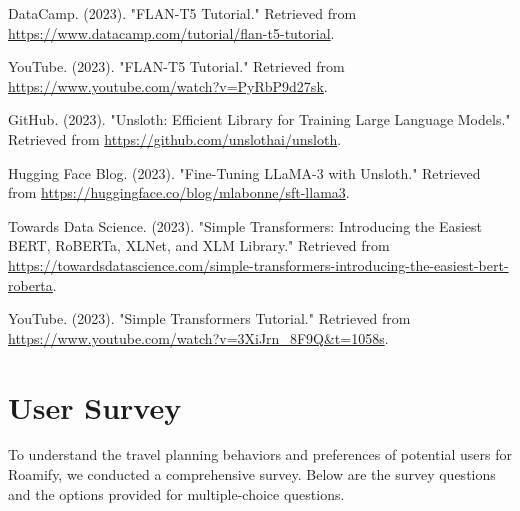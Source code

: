 \documentclass[conference]{IEEEtran}
\begin{document}
\begin{thebibliography}{1}
        DataCamp. (2023). "FLAN-T5 Tutorial." Retrieved from \url{https://www.datacamp.com/tutorial/flan-t5-tutorial}.

        YouTube. (2023). "FLAN-T5 Tutorial." Retrieved from \url{https://www.youtube.com/watch?v=PyRbP9d27sk}.

        GitHub. (2023). "Unsloth: Efficient Library for Training Large Language Models." Retrieved from \url{https://github.com/unslothai/unsloth}.

        Hugging Face Blog. (2023). "Fine-Tuning LLaMA-3 with Unsloth." Retrieved from \url{https://huggingface.co/blog/mlabonne/sft-llama3}.

        Towards Data Science. (2023). "Simple Transformers: Introducing the Easiest BERT, RoBERTa, XLNet, and XLM Library." Retrieved from \url{https://towardsdatascience.com/simple-transformers-introducing-the-easiest-bert-roberta}.

        YouTube. (2023). "Simple Transformers Tutorial." Retrieved from \url{https://www.youtube.com/watch?v=3XiJrn_8F9Q&t=1058s}.

\end{thebibliography}

\newpage

\appendix

\section{User Survey}
    To understand the travel planning behaviors and preferences of potential users for Roamify, we conducted a comprehensive survey. Below are the survey questions and the options provided for multiple-choice questions.
    \\
\end{document}
